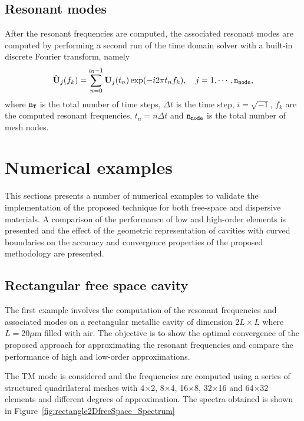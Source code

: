 
\subsection{Resonant modes}
\label{sc:modes}
After the resonant frequencies are computed, the associated resonant modes are computed by performing a second run of the time domain solver with a built-in discrete Fourier transform, namely
\begin{equation*}
    \hat{\mathbf{U}}_j(f_k) = \sum_{n=0}^{\texttt{n}_{\texttt{T}}-1} \mathbf{U}_j (t_n) \exp(-i2\pi t_n f_k), \quad j=1,\cdots,\texttt{n}_{\texttt{node}},
\end{equation*}
where $\texttt{n}_{\texttt{T}}$ is the total number of time steps, $\Delta t$ is the time step, $i = \sqrt{-1}$, $f_k$ are the computed resonant frequencies,  $t_n = n\Delta t$ and $\texttt{n}_{\texttt{node}}$ is the total number of mesh nodes.



\section{Numerical examples} 
\label{sc:examples}

This sections presents a number of numerical examples to validate the implementation of the proposed technique for both free-space and dispersive materials. A comparison of the performance of low and high-order elements is presented and the effect of the geometric representation of cavities with curved boundaries on the accuracy and convergence properties of the proposed methodology are presented.


\subsection{Rectangular free space cavity}
\label{sbc:freeSpace2D}

The first example involves the computation of the resonant frequencies and associated modes on a rectangular metallic cavity of dimension $2L \times L$ where $L=$20$\mu$m filled with air. The objective is to show the optimal convergence of the proposed approach for approximating the resonant frequencies and compare the performance of high and low-order approximations.  

The TM mode is considered and the frequencies are computed using a series of
structured quadrilateral meshes with 4$\times$2, 8$\times$4, 16$\times$8,
32$\times$16 and 64$\times$32 elements and different degrees of approximation.
The spectra obtained is shown in Figure~\ref{fig:rectangle2DfreeSpace_Spectrum}

